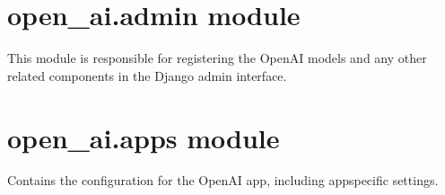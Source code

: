 \documentclass[letterpaper,10pt,english]{sphinxmanual}
\begin{document}
\section{open\_ai.admin module}
\label{\detokenize{open_ai:open-ai-admin-module}}
\sphinxAtStartPar
This module is responsible for registering the OpenAI models and any other related components in the Django admin interface.

\section{open\_ai.apps module}
\label{\detokenize{open_ai:open-ai-apps-module}}\label{\detokenize{open_ai:module-open_ai.admin}}
\sphinxAtStartPar
Contains the configuration for the OpenAI app, including app\sphinxhyphen{}specific settings.
\label{\detokenize{open_ai:module-open_ai.apps}}
\end{document}
